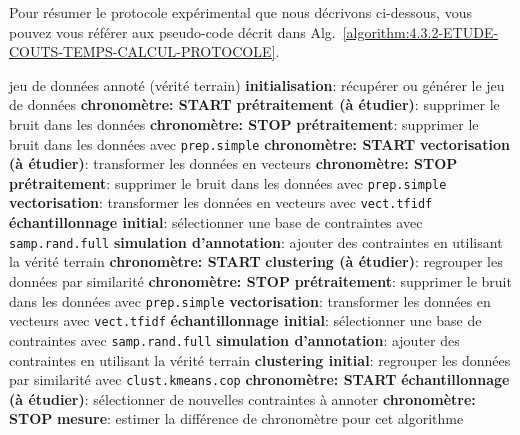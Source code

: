 			Pour résumer le protocole expérimental que nous décrivons ci-dessous, vous pouvez vous référer aux pseudo-code décrit dans Alg.~\ref{algorithm:4.3.2-ETUDE-COUTS-TEMPS-CALCUL-PROTOCOLE}.
			\begin{algorithm}[!htb]
				\begin{algorithmic}[1]
					\Require jeu de données annoté (vérité terrain)
						\State \textbf{initialisation}: récupérer ou générer le jeu de données
							\State \textbf{chronomètre: START}
							\State \textbf{prétraitement (à étudier)}: supprimer le bruit dans les données
							\State \textbf{chronomètre: STOP}
							\State \textbf{prétraitement}: supprimer le bruit dans les données avec \texttt{prep.simple}
							\State \textbf{chronomètre: START}
							\State \textbf{vectorisation (à étudier)}: transformer les données en vecteurs
							\State \textbf{chronomètre: STOP}
							\State \textbf{prétraitement}: supprimer le bruit dans les données avec \texttt{prep.simple}
							\State \textbf{vectorisation}: transformer les données en vecteurs avec \texttt{vect.tfidf}
							\State \textbf{échantillonnage initial}: sélectionner une base de contraintes avec \texttt{samp.rand.full}
							\State \textbf{simulation d'annotation}: ajouter des contraintes en utilisant la vérité terrain
							\State \textbf{chronomètre: START}
							\State \textbf{clustering (à étudier)}: regrouper les données par similarité
							\State \textbf{chronomètre: STOP}
							\State \textbf{prétraitement}: supprimer le bruit dans les données avec \texttt{prep.simple}
							\State \textbf{vectorisation}: transformer les données en vecteurs avec \texttt{vect.tfidf}
							\State \textbf{échantillonnage initial}: sélectionner une base de contraintes avec \texttt{samp.rand.full}
							\State \textbf{simulation d'annotation}: ajouter des contraintes en utilisant la vérité terrain
							\State \textbf{clustering initial}: regrouper les données par similarité avec \texttt{clust.kmeans.cop}
							\State \textbf{chronomètre: START}
							\State \textbf{échantillonnage (à étudier)}: sélectionner de nouvelles contraintes à annoter
							\State \textbf{chronomètre: STOP}
						\EndIf
						\State \textbf{mesure}: estimer la différence de chronomètre pour cet algorithme

\end{algorithmic}
\end{algorithm}
